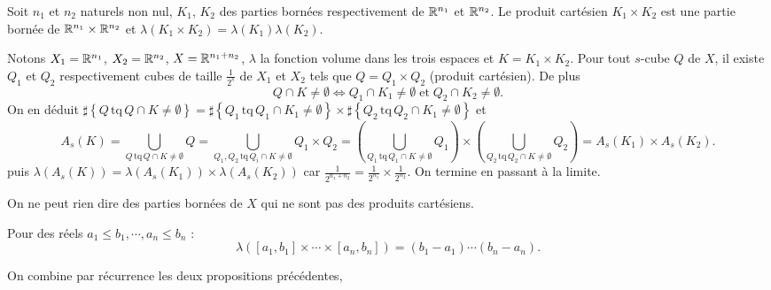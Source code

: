 \begin{propn}
 Soit $n_1$ et $n_2$ naturels non nul, $K_1$, $K_2$ des parties bornées respectivement de $\mathbb{R}^{n_1}$ et $\mathbb{R}^{n_2}$. Le produit cartésien $K_1\times K_2$ est une partie bornée de  $\mathbb{R}^{n_1} \times \mathbb{R}^{n_2}$ et $\lambda(K_1\times K_2)=\lambda(K_1)\lambda( K_2)$.
\end{propn}
\begin{demo}
Notons $X_1=\mathbb{R}^{n_1}$, $X_2=\mathbb{R}^{n_2}$, $X=\mathbb{R}^{n_1 + n_2}$, $\lambda$ la fonction volume dans les trois espaces et $K=K_1 \times K_2$. Pour tout $s$-cube $Q$ de $X$, il existe $Q_1$ et $Q_2$ respectivement cubes de taille $\frac{1}{2^s}$ de $X_1$ et $X_2$ tels que $Q=Q_1 \times Q_2$ (produit cartésien). De plus
\begin{displaymath}
 Q \cap K \neq \emptyset \Leftrightarrow Q_1 \cap K_1 \neq \emptyset \; \mathrm{ et } \; Q_2 \cap K_2 \neq \emptyset .
\end{displaymath}
On en déduit
$\sharp \left\lbrace Q \,\mathrm{tq}\, Q \cap K \neq \emptyset \right\rbrace =
\sharp \left\lbrace Q_1 \,\mathrm{tq}\, Q_1 \cap K_1 \neq \emptyset \right\rbrace
\times
\sharp \left\lbrace Q_2 \,\mathrm{tq}\, Q_2 \cap K_1 \neq \emptyset \right\rbrace$
et
\begin{displaymath}
 A_s(K) = \bigcup_{Q \,\mathrm{tq}\, Q \cap K \neq \emptyset} Q = \bigcup_{Q_1, Q_2 \,\mathrm{tq}\, Q_i \cap K \neq \emptyset} Q_1\times Q_2
 = \left( \bigcup_{Q_1 \,\mathrm{tq}\, Q_1 \cap K \neq \emptyset} Q_1\right) \times \left( \bigcup_{Q_2 \,\mathrm{tq}\, Q_2 \cap K \neq \emptyset} Q_2\right)
 = A_s(K_1) \times A_s(K_2).
\end{displaymath}
puis $\lambda(A_s(K)) = \lambda(A_s(K_1))\times \lambda(A_s(K_2))$ car $\frac{1}{2^{n_1+n_2}}=\frac{1}{2^{n_1}}\times \frac{1}{2^{n_2}}$. On termine en passant à la limite.
\end{demo}
On ne peut rien dire des parties bornées de $X$ qui ne sont pas des produits cartésiens.
\begin{propn}
Pour des réels $a_1 \leq b_1, \cdots , a_n \leq b_n$ :
\begin{displaymath}
 \lambda([a_1,b_1]\times \cdots \times [a_n,b_n]) = (b_1-a_1) \cdots (b_n-a_n).
\end{displaymath}
\end{propn}
\begin{demo}
On combine par récurrence les deux propositions précédentes,
\end{demo}

